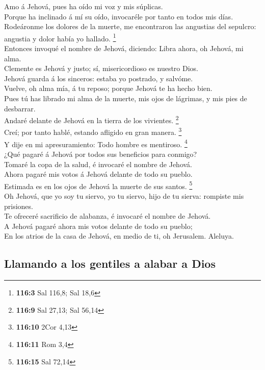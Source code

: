  Amo á Jehová, pues ha oído mi voz y mis súplicas.\\
 Porque ha inclinado á mí su oído, invocaréle por tanto en
todos mis días.\\
 Rodeáronme los dolores de la muerte, me encontraron las
angustias del sepulcro: angustia y dolor había yo hallado. \footnote{\textbf{116:3}
  Sal 116,8; Sal 18,6}\\
 Entonces invoqué el nombre de Jehová, diciendo: Libra
ahora, oh Jehová, mi alma.\\
 Clemente es Jehová y justo; sí, misericordioso es nuestro
Dios.\\
 Jehová guarda á los sinceros: estaba yo postrado, y
salvóme.\\
 Vuelve, oh alma mía, á tu reposo; porque Jehová te ha hecho
bien.\\
 Pues tú has librado mi alma de la muerte, mis ojos de
lágrimas, y mis pies de desbarrar.\\
 Andaré delante de Jehová en la tierra de los vivientes.
\footnote{\textbf{116:9} Sal 27,13; Sal 56,14}\\
 Creí; por tanto hablé, estando afligido en gran manera.
\footnote{\textbf{116:10} 2Cor 4,13}\\
 Y dije en mi apresuramiento: Todo hombre es mentiroso.
\footnote{\textbf{116:11} Rom 3,4}\\
 ¿Qué pagaré á Jehová por todos sus beneficios para
conmigo?\\
 Tomaré la copa de la salud, é invocaré el nombre de
Jehová.\\
 Ahora pagaré mis votos á Jehová delante de todo su
pueblo.\\
 Estimada es en los ojos de Jehová la muerte de sus santos.
\footnote{\textbf{116:15} Sal 72,14}\\
 Oh Jehová, que yo soy tu siervo, yo tu siervo, hijo de tu
sierva: rompiste mis prisiones.\\
 Te ofreceré sacrificio de alabanza, é invocaré el nombre
de Jehová.\\
 A Jehová pagaré ahora mis votos delante de todo su
pueblo;\\
 En los atrios de la casa de Jehová, en medio de ti, oh
Jerusalem. Aleluya.

\hypertarget{llamando-a-los-gentiles-a-alabar-a-dios}{%
\subsection{Llamando a los gentiles a alabar a
Dios}\label{llamando-a-los-gentiles-a-alabar-a-dios}}

